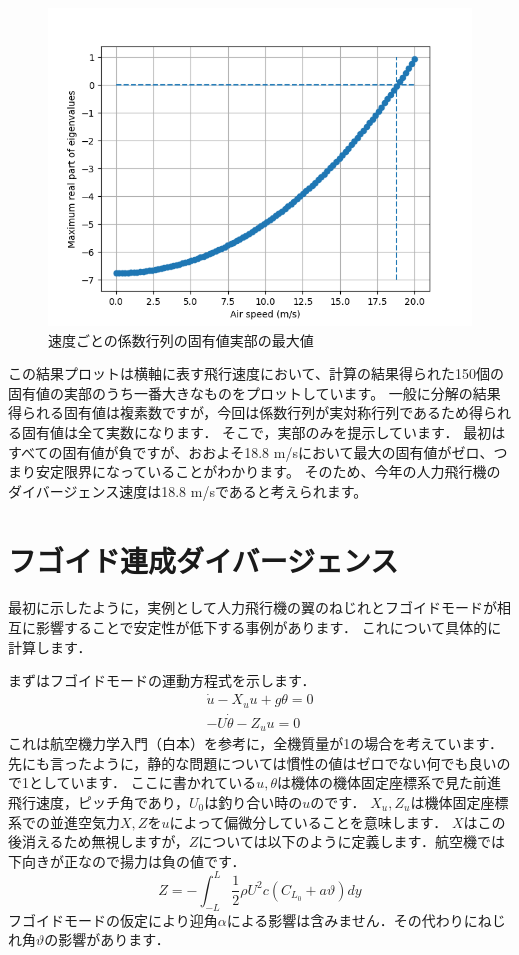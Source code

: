\documentclass{jarticle}
\begin{document}
\begin{figure}[H]
    \centering
    \includegraphics[width=0.8\linewidth]{image/Eigenvalues_of_divergence.png}
    \caption{速度ごとの係数行列の固有値実部の最大値}
    \label{eigen1}
\end{figure}

この結果プロットは横軸に表す飛行速度において、計算の結果得られた150個の固有値の実部のうち一番大きなものをプロットしています。
一般に分解の結果得られる固有値は複素数ですが，今回は係数行列が実対称行列であるため得られる固有値は全て実数になります．
そこで，実部のみを提示しています．
最初はすべての固有値が負ですが、おおよそ18.8 m/sにおいて最大の固有値がゼロ、つまり安定限界になっていることがわかります。
そのため、今年の人力飛行機のダイバージェンス速度は18.8 m/sであると考えられます。

\section{フゴイド連成ダイバージェンス}

最初に示したように，実例として人力飛行機の翼のねじれとフゴイドモードが相互に影響することで安定性が低下する事例があります．
これについて具体的に計算します．

まずはフゴイドモードの運動方程式を示します．
\begin{align} 
    \dot{u} - X_u u + g \theta = 0\\
    -U\dot{\theta} - Z_u u = 0
\end{align}
これは航空機力学入門（白本）を参考に，全機質量が1の場合を考えています．先にも言ったように，静的な問題については慣性の値はゼロでない何でも良いので1としています．
ここに書かれている$u,\theta$は機体の機体固定座標系で見た前進飛行速度，ピッチ角であり，$U_0$は釣り合い時の$u$のです．
$X_u,Z_u$は機体固定座標系での並進空気力$X,Z$を$u$によって偏微分していることを意味します．
$X$はこの後消えるため無視しますが，$Z$については以下のように定義します．航空機では下向きが正なので揚力は負の値です．
\begin{equation}
    Z = -\int_{-L}^L \frac{1}{2}\rho U^2 c (C_{L_0} + a\vartheta) dy
\end{equation}
フゴイドモードの仮定により迎角$\alpha$による影響は含みません．その代わりにねじれ角$\vartheta$の影響があります．
\end{document}
